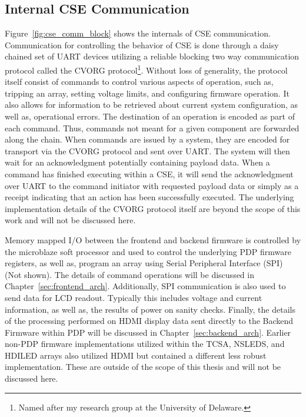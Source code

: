     \subsection{Internal CSE Communication}
        Figure~\ref{fig:cse_comm_block} shows the internals of CSE communication. Communication for controlling the behavior of CSE is done through a daisy chained set of UART devices utilizing a reliable blocking two way communication protocol called the CVORG protocol\footnote{Named after my research group at the University of Delaware.}. Without loss of generality, the protocol itself consist of commands to control various aspects of operation, such as, tripping an array, setting voltage limits, and configuring firmware operation. It also allows for information to be retrieved about current system configuration, as well as, operational errors. The destination of an operation is encoded as part of each command. Thus, commands not meant for a given component are forwarded along the chain. When commands are issued by a system, they are encoded for transport via the CVORG protocol and sent over UART. The system will then wait for an acknowledgment potentially containing payload data. When a command has finished executing within a CSE, it will send the acknowledgment over UART to the command initiator with requested payload data or simply as a receipt indicating that an action has been successfully executed. The underlying implementation details of the CVORG protocol itself are beyond the scope of this work and will not be discussed here.

        Memory mapped I/O between the frontend and backend firmware is controlled by the microblaze soft processor and used to control the underlying PDP firmware registers, as well as, program an array using Serial Peripheral Interface (SPI) (Not shown). The details of command operations will be discussed in Chapter~\ref{sec:frontend_arch}. Additionally, SPI communication is also used to send data for LCD readout. Typically this includes voltage and current information, as well as, the results of power on sanity checks. Finally, the details of the processing performed on HDMI display data sent directly to the Backend Firmware within PDP will be discussed in Chapter~\ref{sec:backend_arch}. Earlier non-PDP firmware implementations utilized within the TCSA, NSLEDS, and HDILED arrays also utilized HDMI but contained a different less robust implementation. These are outside of the scope of this thesis and will not be discussed here.

